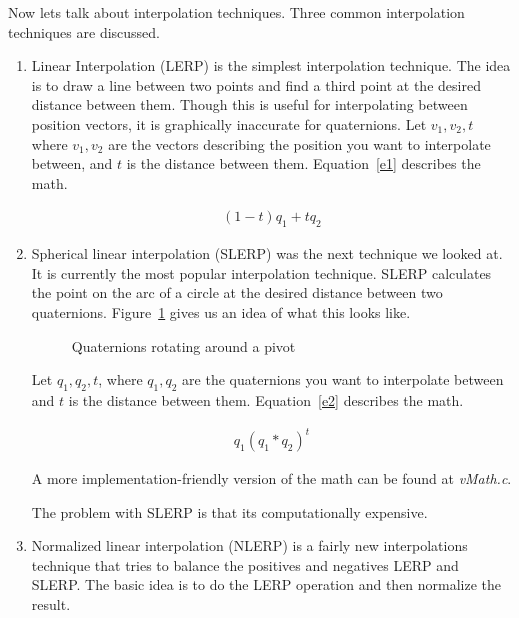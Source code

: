 \documentclass[10pt]{article}
\begin{document}
Now lets talk about interpolation techniques. Three 
common interpolation techniques are discussed. 
\begin{enumerate}
\item Linear Interpolation (LERP) is the simplest interpolation technique. The
idea is to draw a line between two points and find a third point at the desired
distance between them. Though this is useful for interpolating between position
vectors, it is graphically inaccurate for quaternions. Let $v_1, v_2, t$ where $v_1, v_2$ 
are the vectors describing the position you want to interpolate between, and $t$ 
is the distance between them. Equation~\ref{e1} describes the math. 

\begin{align}
\label{e1}
(1-t)q_1 + tq_2
\end{align}

\item 
Spherical linear interpolation (SLERP) was the next technique we looked at. It
is currently the most popular interpolation technique. SLERP calculates the
point on the arc of a circle at the desired distance between two quaternions.
Figure~\ref{f1} gives us an idea of what this looks like.

\begin{figure}[H]
   \begin{center}
      \caption{Quaternions rotating around a pivot}
      \label{f1}
   \end{center}
\end{figure}

Let $q_1, q_2, t$, where $q_1, q_2$ are the quaternions you want to interpolate
between and $t$ is the distance between them. Equation~\ref{e2} describes the math. 

\begin{align}
\label{e2}
q_1(q_1*q_2)^t
\end{align}

A more implementation-friendly version of the math can be found at
\textit{vMath.c}.

The problem with SLERP is that its computationally expensive. 

\item
Normalized linear interpolation (NLERP) is a fairly new interpolations
technique that tries to balance the positives and negatives LERP and
SLERP. The basic idea is to do the LERP operation and then normalize the result.


\end{enumerate}
\end{document}
